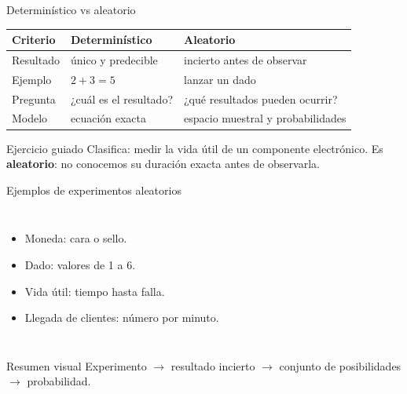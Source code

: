\documentclass[aspectratio=169,11pt]{beamer}
\begin{document}
\begin{frame}{Determinístico vs aleatorio}
\small
\begin{center}
\begin{tabular}{p{}p{}p{}}
\toprule
Criterio & Determinístico & Aleatorio \\
\midrule
Resultado & único y predecible & incierto antes de observar \\
Ejemplo & $2+3=5$ & lanzar un dado \\
Pregunta & ¿cuál es el resultado? & ¿qué resultados pueden ocurrir? \\
Modelo & ecuación exacta & espacio muestral y probabilidades \\
\bottomrule
\end{tabular}
\end{center}
\pause
\begin{exampleblock}{Ejercicio guiado}
Clasifica: medir la vida útil de un componente electrónico. \pause Es \textbf{aleatorio}: no conocemos su duración exacta antes de observarla.
\end{exampleblock}
\end{frame}

\begin{frame}{Ejemplos de experimentos aleatorios}
\begin{columns}[T]
\begin{itemize}
  \item Moneda: cara o sello.
  \item Dado: valores de 1 a 6.
  \item Vida útil: tiempo hasta falla.
  \item Llegada de clientes: número por minuto.
\end{itemize}
\end{columns}
\begin{alertblock}{Resumen visual}
Experimento $\rightarrow$ resultado incierto $\rightarrow$ conjunto de posibilidades $\rightarrow$ probabilidad.
\end{alertblock}
\end{frame}
\end{document}
